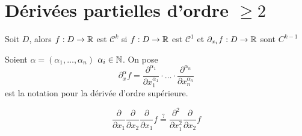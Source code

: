 \section{Dérivées partielles d'ordre $\ge 2$}
\begin{definition}
    Soit $D$, alors  $f: D \to \mathbb{R}$ est $\mathcal{C}^k$ si  $f: D \to \mathbb{R}$ est $\mathcal{C}^1$ et  $\partial_{x_i}f: D \to \mathbb{R}$ sont $C^{k-1}$
\end{definition}

\begin{definition}
    Soient $\alpha = (\alpha_1, \ldots, \alpha_n)$ \quad $\alpha_i \in \mathbb{N}$. On pose
    \[
        \partial_{x}^{\alpha}f = \frac{\partial^{\alpha_1}}{\partial x_1^{\alpha_1}} \cdot \ldots \cdot \frac{\partial^{\alpha_n}}{\partial x_n^{\alpha_n}}
    \] 
    est la notation pour la dérivée d'ordre supérieure.
\end{definition}
\[
    \frac{\partial}{\partial x_1}\frac{\partial}{\partial x_2}\frac{\partial}{\partial x_1} f \overset{?}{=}  \frac{\partial^2}{\partial x_1^2}\frac{\partial}{\partial x_2}f
\] 

